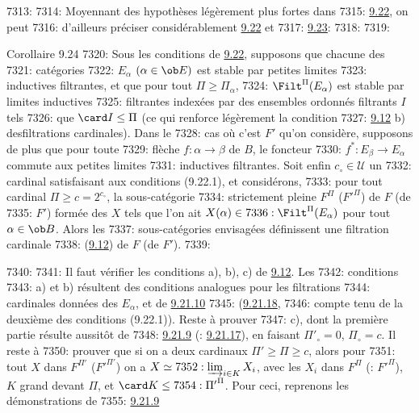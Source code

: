 7313: 
7314: Moyennant des hypothèses légèrement plus fortes dans
7315: \hyperref[I.them9.22]{9.22}, on peut
7316: d'ailleurs préciser considérablement \hyperref[I.them9.22]{9.22} et
7317: \hyperref[I.cor9.23]{9.23}:
7318: 
7319: \begin{enonce*}{Corollaire 9.24}
7320: Sous les conditions de \hyperref[I.them9.22]{9.22}, supposons que chacune des
7321: catégories
7322: $E_{\alpha}$ $(\alpha\in \ob E)$ est stable par petites limites
7323: inductives filtrantes, et que pour tout $\Pi\geq \Pi_{\alpha}$,
7324: $\Filt^{\Pi}(E_{\alpha})$ est stable par limites inductives
7325: filtrantes indexées par des ensembles ordonnés filtrants $I$ tels
7326: que $\card I\leq \Pi$ (ce qui renforce légèrement la condition
7327: \hyperref[I.def9.12]{9.12} {\rm b)} des\pageoriginale filtrations cardinales). Dans le
7328: cas où c'est $F'$ qu'on considère, supposons de plus que pour toute
7329: flèche $f:\alpha\rightarrow \beta$ de $B$, le foncteur
7330: $f^\ast:E_{\beta}\rightarrow E_{\alpha}$ commute aux petites limites
7331: inductives filtrantes. Soit enfin $c_{\circ}\in 𝒰$ un
7332: cardinal satisfaisant aux conditions (9.22.1), et considérons,
7333: pour tout cardinal $\Pi\geq c=2^{c_{\circ}}$, la sous-catégorie
7334: strictement pleine $F^{\Pi}$ (\resp ${F'}^{\Pi}$) de $F$ (\resp de
7335: $F'$) formée des $X$ tels que l'on ait $X(\alpha)\in
7336: \Filt^{\Pi}(E_{\alpha})$ pour tout $\alpha\in \ob B$. Alors les
7337: sous-catégories envisagées définissent une filtration cardinale
7338: (\hyperref[I.def9.12]{9.12}) de $F$ (\resp de $F'$).
7339: \end{enonce*}
7340: 
7341: Il faut vérifier les conditions a), b), c) de \hyperref[I.def9.12]{9.12}. Les
7342: conditions
7343: a) et b) résultent des conditions analogues pour les filtrations
7344: cardinales données des $E_{\alpha}$, et de \hyperref[I.lem9.21.10]{9.21.10}
7345: (\resp\hyperref[I.lem9.21.18]{9.21.18},
7346: compte tenu de la deuxième des conditions (9.22.1)). Reste à prouver
7347: c), dont la première partie résulte aussitôt de
7348: \hyperref[I.lem9.21.9]{9.21.9} (: \hyperref[I.lem9.21.17]{9.21.17}), en faisant $\Pi'_{\circ}=0$, $\Pi_{\circ}=c$. Il reste à
7350: prouver que si on a deux cardinaux $\Pi'\geq \Pi\geq c$, alors pour
7351: tout $X$ dans $F^{\Pi'}$ (\resp ${F'}^{\Pi'}$) on a $X\simeq
7352: \varinjlim_{i\in K}X_i$, avec les $X_i$ dans $F^{\Pi}$ (: ${F'}^{\Pi}$), $K$ grand devant $\Pi$, et $\card K\leq
7354: {\Pi'}^{\Pi}$. Pour ceci, reprenons les démonstrations de
7355: \hyperref[I.lem9.21.9]{9.21.9}

